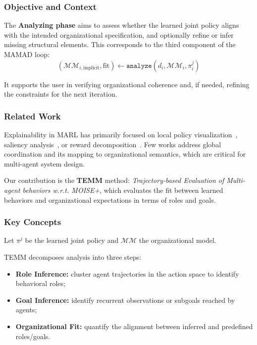 \documentclass[pdflatex,sn-mathphys-num]{sn-jnl}%
\theoremstyle{thmstyleone}%
\theoremstyle{thmstyletwo}%
\theoremstyle{thmstylethree}%
\begin{document}
\subsubsection*{Objective and Context}

The \textbf{Analyzing phase} aims to assess whether the learned joint policy aligns with the intended organizational specification, and optionally refine or infer missing structural elements. This corresponds to the third component of the MAMAD loop:
\[
(\mathcal{MM}_{i,\text{implicit}}, \text{fit}) \gets \texttt{analyze}(d_i, \mathcal{MM}_i, \pi^j_i)
\]

It supports the user in verifying organizational coherence and, if needed, refining the constraints for the next iteration.

\subsubsection*{Related Work}

Explainability in MARL has primarily focused on local policy visualization~\cite{madrona2023explain}, saliency analysis~\cite{verma2022attention}, or reward decomposition~\cite{juozapaitis2019explainable}. Few works address global coordination and its mapping to organizational semantics, which are critical for multi-agent system design.

Our contribution is the \textbf{TEMM} method: \emph{Trajectory-based Evaluation of Multi-agent behaviors w.r.t. MOISE+}, which evaluates the fit between learned behaviors and organizational expectations in terms of roles and goals.

\subsubsection*{Key Concepts}

Let $\pi^j$ be the learned joint policy and $\mathcal{MM}$ the organizational model.

TEMM decomposes analysis into three steps:

\begin{itemize}
    \item \textbf{Role Inference:} cluster agent trajectories in the action space to identify behavioral roles;
    \item \textbf{Goal Inference:} identify recurrent observations or subgoals reached by agents;
    \item \textbf{Organizational Fit:} quantify the alignment between inferred and predefined roles/goals.
\end{itemize}
\end{document}
